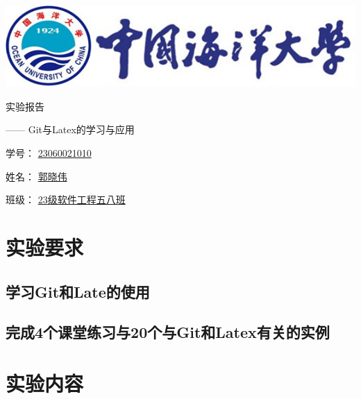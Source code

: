 \documentclass[UTF8,a4paper]{ctexart}
\begin{document}
\begin{sloppypar}


	\begin{center}
	\includegraphics[width = 14cm]{picture/s1}

		\begin{fontsize}{60pt}{20pt}
			实验报告
		\end{fontsize}

		\bigskip
		\bigskip
		
		\begin{fontsize}{20pt}{20pt}
			\begin{flushright}
				—— {\Huge Git}与{\Huge Latex}的学习与应用
			\end{flushright}
		\end{fontsize}
		
		\bigskip
		\bigskip
		\bigskip
		\bigskip
		\bigskip
		\bigskip
		\bigskip
		\bigskip
		\bigskip
		\bigskip
		\bigskip
		\bigskip
		\bigskip
		\bigskip
		\bigskip
		\bigskip
		
		\begin{fontsize}{25pt}{20pt}

			学号：
			\underline{{\huge 23060021010}}
			\bigskip
			\bigskip
			\bigskip
			\bigskip

			姓名：
			\underline{郭晓伟}
			\bigskip
			\bigskip
			\bigskip
			\bigskip

			班级：
			\underline{{\Huge 23}级软件工程五八班}
				
		\end{fontsize}
	\end{center}
	\section{实验要求}
	\subsection{学习Git和Late的使用}
	\subsection{完成4个课堂练习与20个与Git和Latex有关的实例}

	\section{实验内容}

\end{sloppypar}
\end{document}
